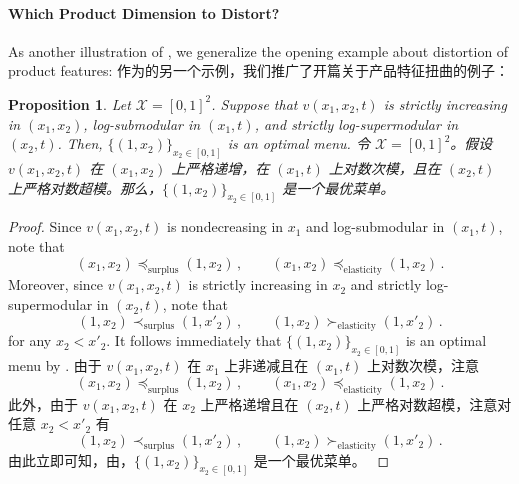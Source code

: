\documentclass[12pt,letterpaper]{article}
\newenvironment{original}{\color{black}\noindent}{}
\newenvironment{translation}{\color{blue}\noindent}{}
\theoremstyle{plain}
\newtheorem{prop}{Proposition}
\theoremstyle{definition}
\theoremstyle{remark}
\renewcommand{\1}{\mathds{1}}
\theoremstyle{definition}
\begin{document}
\paragraph{Which Product Dimension to Distort?}\hspace{-2mm}\begin{original}As another illustration of , we generalize the opening example about distortion of product features:
\end{original}
\begin{translation}
作为的另一个示例，我们推广了开篇关于产品特征扭曲的例子：
\end{translation}

\begin{prop}\label{prop:distortion}
\begin{original}
Let $\mathcal{X} = [0, 1]^2$. Suppose that $v(x_1, x_2, t)$ is strictly increasing in $(x_1, x_2)$, log-submodular in $(x_1, t)$, and strictly log-supermodular in $(x_2, t)$. Then, $\{(1, x_2)\}_{x_2 \in [0, 1]}$ is an optimal menu.
\end{original}
\begin{translation}
令 $\mathcal{X} = [0, 1]^2$。假设 $v(x_1, x_2, t)$ 在 $(x_1, x_2)$ 上严格递增，在 $(x_1, t)$ 上对数次模，且在 $(x_2, t)$ 上严格对数超模。那么，$\{(1, x_2)\}_{x_2 \in [0, 1]}$ 是一个最优菜单。
\end{translation}
\end{prop}
\begin{proof}
\begin{original}
Since $v(x_1, x_2, t)$ is nondecreasing in $x_1$ and log-submodular in $(x_1, t)$, note that
\[(x_1, x_2) \preceq_{\text{surplus}} (1, x_2)\,, \qquad (x_1, x_2) \preceq_{\text{elasticity}} (1, x_2)\,.\]
Moreover, since $v(x_1, x_2, t)$ is strictly increasing in $x_2$ and strictly log-supermodular in $(x_2, t)$, note that
\[(1, x_2) \prec_{\text{surplus}} (1, x'_2)\,, \qquad (1, x_2) \succ_{\text{elasticity}} (1, x'_2)\,.\]
for any $x_2 < x'_2$. It follows immediately that $\{(1, x_2)\}_{x_2 \in [0, 1]}$ is an optimal menu by .
\end{original}
\begin{translation}
由于 $v(x_1, x_2, t)$ 在 $x_1$ 上非递减且在 $(x_1, t)$ 上对数次模，注意
\[(x_1, x_2) \preceq_{\text{surplus}} (1, x_2)\,, \qquad (x_1, x_2) \preceq_{\text{elasticity}} (1, x_2)\,.\]
此外，由于 $v(x_1, x_2, t)$ 在 $x_2$ 上严格递增且在 $(x_2, t)$ 上严格对数超模，注意对任意 $x_2 < x'_2$ 有
\[(1, x_2) \prec_{\text{surplus}} (1, x'_2)\,, \qquad (1, x_2) \succ_{\text{elasticity}} (1, x'_2)\,.\]
由此立即可知，由，$\{(1, x_2)\}_{x_2 \in [0, 1]}$ 是一个最优菜单。
\end{translation}
\end{proof}
\end{document}
